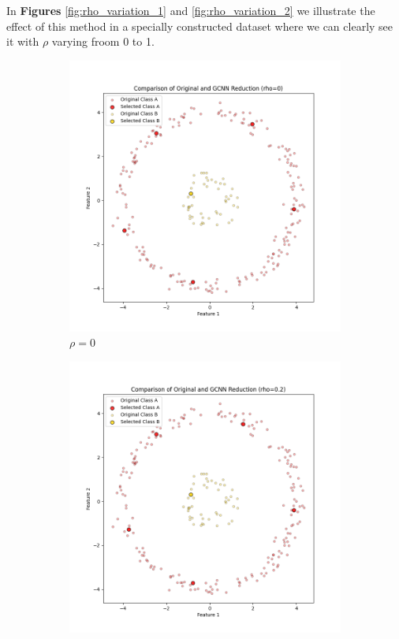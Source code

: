 In \textbf{Figures} \ref{fig:rho_variation_1} and \ref{fig:rho_variation_2} we illustrate the effect of this method in a specially constructed dataset where we can clearly see it with $\rho$ varying froom 0 to 1.

\begin{figure}[htbp]
	\centering
	\begin{subfigure}[b]{0.3\textwidth}
		\centering
		\includegraphics[width=\textwidth]{figures/gcnn/comparison_plot_rho_0.png}
		\caption{$\rho = 0$}
		\label{fig:rho0}
	\end{subfigure}
	\hfill
	\begin{subfigure}[b]{0.3\textwidth}
		\centering
		\includegraphics[width=\textwidth]{figures/gcnn/comparison_plot_rho_0.2.png}

\end{subfigure}
\end{figure}
